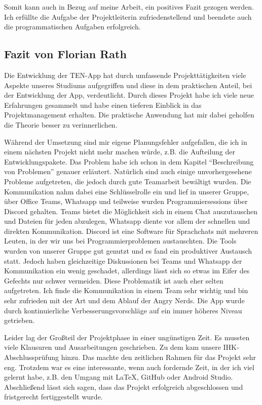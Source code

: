 Somit kann auch in Bezug auf meine Arbeit, ein positives Fazit gezogen werden. Ich erfüllte die Aufgabe der Projektleiterin zufriedenstellend und beendete auch die programmatischen Aufgaben erfolgreich.

\subsection{Fazit von Florian Rath}

Die Entwicklung der TEN-App hat durch umfassende Projekttätigkeiten viele Aspekte unseres Studiums aufgegriffen und diese in dem praktischen Anteil, bei der Entwicklung der App, verdeutlicht. Durch dieses Projekt habe ich viele neue Erfahrungen gesammelt und habe einen tieferen Einblick in das Projektmanagement erhalten. Die praktische Anwendung hat mir dabei geholfen die Theorie besser zu verinnerlichen.

Während der Umsetzung sind mir eigene Planungsfehler aufgefallen, die ich in einem nächsten Projekt nicht mehr machen würde, z.B. die Aufteilung der Entwicklungspakete. Das Problem habe ich schon in dem Kapitel “Beschreibung von Problemen” genauer erläutert. Natürlich sind auch einige unvorhergesehene Probleme aufgetreten, die jedoch durch gute Teamarbeit bewältigt wurden. Die Kommunikation nahm dabei eine Schlüsselrolle ein und lief in unserer Gruppe, über Office Teams, Whatsapp und teilweise wurden Programmiersessions über Discord gehalten. Teams bietet die Möglichkeit sich in einem Chat auszutauschen und Dateien für jeden abzulegen, Whatsapp diente vor allem der schnellen und direkten Kommunikation. Discord ist eine Software für Sprachchats mit mehreren Leuten, in der wir uns bei Programmierproblemen austauschten. Die Tools wurden von unserer Gruppe gut genutzt und es fand ein produktiver Austausch statt. Jedoch haben gleichzeitige Diskussionen bei Teams und Whatsapp der Kommunikation ein wenig geschadet, allerdings lässt sich so etwas im Eifer des Gefechts nur schwer vermeiden. Diese Problematik ist auch eher selten aufgetreten. Ich finde die Kommunikation in einem Team sehr wichtig und bin sehr zufrieden mit der Art und dem Ablauf der Angry Nerds. Die App wurde durch kontinuierliche Verbesserungsvorschläge auf ein immer höheres Niveau getrieben.

Leider lag der Großteil der Projektphase in einer ungünstigen Zeit. Es mussten viele Klausuren und Ausarbeitungen geschrieben. Zu dem kam unsere IHK-Abschlussprüfung hinzu. Das machte den zeitlichen Rahmen für das Projekt sehr eng. Trotzdem war es eine interessante, wenn auch fordernde Zeit, in der ich viel gelernt habe, z.B. den Umgang mit LaTeX, GitHub oder Android Studio. Abschließend lässt sich sagen, dass das Projekt erfolgreich abgeschlossen und fristgerecht fertiggestellt wurde.


